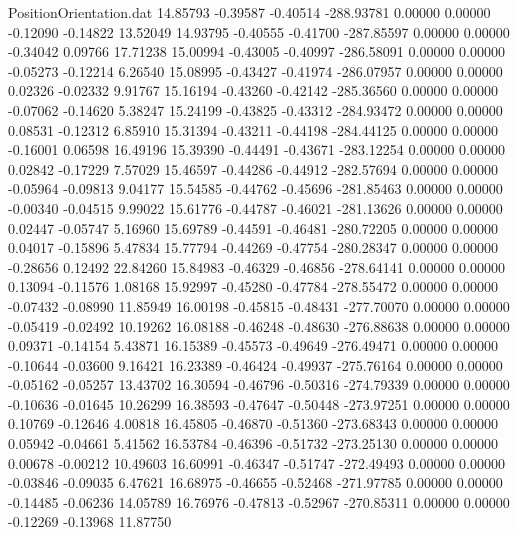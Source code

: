 \begin{filecontents}{PositionOrientation.dat}
  14.85793   -0.39587   -0.40514  -288.93781    0.00000    0.00000   -0.12090   -0.14822   13.52049
  14.93795   -0.40555   -0.41700  -287.85597    0.00000    0.00000   -0.34042    0.09766   17.71238
  15.00994   -0.43005   -0.40997  -286.58091    0.00000    0.00000   -0.05273   -0.12214    6.26540
  15.08995   -0.43427   -0.41974  -286.07957    0.00000    0.00000    0.02326   -0.02332    9.91767
  15.16194   -0.43260   -0.42142  -285.36560    0.00000    0.00000   -0.07062   -0.14620    5.38247
  15.24199   -0.43825   -0.43312  -284.93472    0.00000    0.00000    0.08531   -0.12312    6.85910
  15.31394   -0.43211   -0.44198  -284.44125    0.00000    0.00000   -0.16001    0.06598   16.49196
  15.39390   -0.44491   -0.43671  -283.12254    0.00000    0.00000    0.02842   -0.17229    7.57029
  15.46597   -0.44286   -0.44912  -282.57694    0.00000    0.00000   -0.05964   -0.09813    9.04177
  15.54585   -0.44762   -0.45696  -281.85463    0.00000    0.00000   -0.00340   -0.04515    9.99022
  15.61776   -0.44787   -0.46021  -281.13626    0.00000    0.00000    0.02447   -0.05747    5.16960
  15.69789   -0.44591   -0.46481  -280.72205    0.00000    0.00000    0.04017   -0.15896    5.47834
  15.77794   -0.44269   -0.47754  -280.28347    0.00000    0.00000   -0.28656    0.12492   22.84260
  15.84983   -0.46329   -0.46856  -278.64141    0.00000    0.00000    0.13094   -0.11576    1.08168
  15.92997   -0.45280   -0.47784  -278.55472    0.00000    0.00000   -0.07432   -0.08990   11.85949
  16.00198   -0.45815   -0.48431  -277.70070    0.00000    0.00000   -0.05419   -0.02492   10.19262
  16.08188   -0.46248   -0.48630  -276.88638    0.00000    0.00000    0.09371   -0.14154    5.43871
  16.15389   -0.45573   -0.49649  -276.49471    0.00000    0.00000   -0.10644   -0.03600    9.16421
  16.23389   -0.46424   -0.49937  -275.76164    0.00000    0.00000   -0.05162   -0.05257   13.43702
  16.30594   -0.46796   -0.50316  -274.79339    0.00000    0.00000   -0.10636   -0.01645   10.26299
  16.38593   -0.47647   -0.50448  -273.97251    0.00000    0.00000    0.10769   -0.12646    4.00818
  16.45805   -0.46870   -0.51360  -273.68343    0.00000    0.00000    0.05942   -0.04661    5.41562
  16.53784   -0.46396   -0.51732  -273.25130    0.00000    0.00000    0.00678   -0.00212   10.49603
  16.60991   -0.46347   -0.51747  -272.49493    0.00000    0.00000   -0.03846   -0.09035    6.47621
  16.68975   -0.46655   -0.52468  -271.97785    0.00000    0.00000   -0.14485   -0.06236   14.05789
  16.76976   -0.47813   -0.52967  -270.85311    0.00000    0.00000   -0.12269   -0.13968   11.87750

\end{filecontents}
